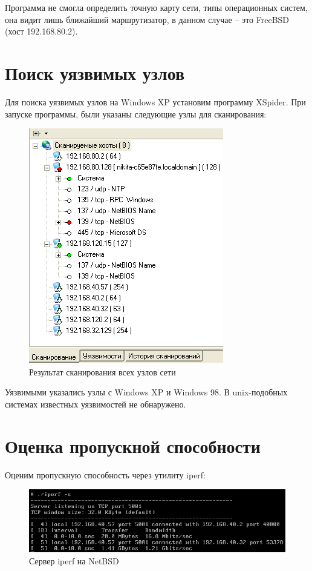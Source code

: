 \documentclass[14pt,a4paper,report]{report}
\begin{document}
Программа не смогла определить точную карту сети, типы операционных систем, она видит лишь ближайший маршрутизатор, в данном случае -- это FreeBSD (хост 192.168.80.2).

\section{Поиск уязвимых узлов}

Для поиска уязвимых узлов на Windows XP установим программу XSpider. При запуске программы, были указаны следующие узлы для сканирования:

\begin{figure}[h!]
	\centering
	\includegraphics[scale = 0.80]{images/2_1.png}
	\caption{Результат сканирования всех узлов сети}
	\label{image:9}
\end{figure}

Уязвимыми указались узлы с Windows XP и Windows 98. В unix-подобных системах известных уязвимостей не обнаружено.

\section{Оценка пропускной способности}

Оценим пропускную способность через утилиту iperf:

\begin{figure}[h!]
	\centering
	\includegraphics[scale = 0.80]{images/3_0.png}
	\caption{Сервер iperf на NetBSD}
	\label{image:10}
\end{figure}
\end{document}
